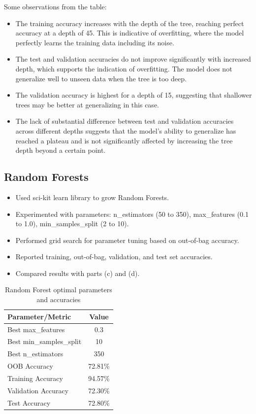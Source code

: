 \documentclass[12pt]{article}
\begin{document}
Some observations from the table:
\begin{itemize}
  \item The training accuracy increases with the depth of the tree, reaching perfect accuracy at a depth of 45. This is indicative of overfitting, where the model perfectly learns the training data including its noise.
  \item The test and validation accuracies do not improve significantly with increased depth, which supports the indication of overfitting. The model does not generalize well to unseen data when the tree is too deep.
  \item The validation accuracy is highest for a depth of 15, suggesting that shallower trees may be better at generalizing in this case.
  \item The lack of substantial difference between test and validation accuracies across different depths suggests that the model's ability to generalize has reached a plateau and is not significantly affected by increasing the tree depth beyond a certain point.
\end{itemize}


\subsection{Random Forests}
    \begin{itemize}
        \item Used sci-kit learn library to grow Random Forests.
        \item Experimented with parameters: n\_estimators (50 to 350), max\_features (0.1 to 1.0), min\_samples\_split (2 to 10).
        \item Performed grid search for parameter tuning based on out-of-bag accuracy.
        \item Reported training, out-of-bag, validation, and test set accuracies.
        \item Compared results with parts (c) and (d).
    \end{itemize}

\begin{table}[h!]
\centering
\begin{tabular}{|l|c|}
\hline
\textbf{Parameter/Metric} & \textbf{Value} \\
\hline
Best max\_features & 0.3 \\
Best min\_samples\_split & 10 \\
Best n\_estimators & 350 \\
OOB Accuracy & 72.81\% \\
Training Accuracy & 94.57\% \\
Validation Accuracy & 72.30\% \\
Test Accuracy & 72.80\% \\
\hline
\end{tabular}
\caption{Random Forest optimal parameters and accuracies}
\label{tab:rf_results}
\end{table}
\end{document}

